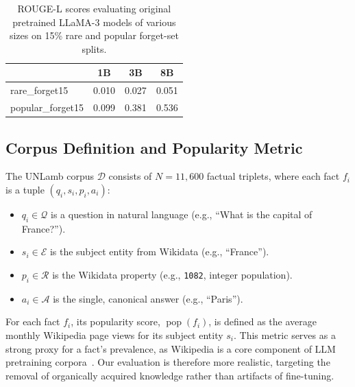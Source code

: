 \documentclass[11pt]{article}
\begin{document}
{\begin{table}[h!t]
\caption{ROUGE-L scores evaluating original pretrained LLaMA-3 models of various sizes on 15\% rare and popular forget-set splits.}
  \label{tab:orig_forget15_by_size}
  \centering
  \small
  \setlength{\tabcolsep}{6pt}
  \begin{tabular}{lccc}
    \hline
     & \textbf{1B} & \textbf{3B} & \textbf{8B} \\ 
    \hline
    rare\_forget15 & 0.010 & 0.027 & 0.051 \\
    \hline
    popular\_forget15 & 0.099 & 0.381 & 0.536 \\
    \hline
  \end{tabular}
  
\end{table}





\subsection{Corpus Definition and Popularity Metric}

The UNLamb corpus $\mathcal{D}$ consists of $N=11,600$ factual triplets, where each fact $f_i$ is a tuple $(q_i, s_i, p_i, a_i)$:
\begin{itemize}
    \item $q_i \in \mathcal{Q}$ is a question in natural language (e.g., \enquote{What is the capital of France?}).
    \item $s_i \in \mathcal{E}$ is the subject entity from Wikidata (e.g., \enquote{France}).
    \item $p_i \in \mathcal{R}$ is the Wikidata property (e.g., \texttt{1082}, integer population).
    \item $a_i \in \mathcal{A}$ is the single, canonical answer (e.g., \enquote{Paris}).
\end{itemize}


For each fact $f_i$, its popularity score, $\operatorname{pop}(f_i)$, is defined as the average monthly Wikipedia page views for its subject entity $s_i$.
This metric serves as a strong proxy for a fact's prevalence, as Wikipedia is a core component of LLM pretraining corpora~\cite{gao2020pile, dodge2021documenting}. Our evaluation is therefore more realistic, targeting the removal of organically acquired knowledge rather than artifacts of fine-tuning.


}
\end{document}
